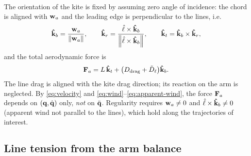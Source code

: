 \documentclass[10pt, a4paper]{article}
\begin{document}
The orientation of the kite is fixed by
assuming zero angle of incidence: the chord is aligned with $\vb w_a$ and
the leading edge is perpendicular to the lines, i.e.
\begin{equation} \label{eq:aero-frame}
    \vu k_b = \frac{\vb w_a}{\norm{\vb w_a}},
    \qquad
    \vu k_r = \frac{\hat \ell \times \vu k_b}{\norm{\hat \ell \times \vu k_b}},
    \qquad
    \vu k_t = \vu k_b \times \vu k_r,
\end{equation}
and the total aerodynamic force is
\begin{equation} \label{eq:f-aero}
    \vb F_a = L\,\vu k_t
    + \bigl( D_{\mathrm{drag}} + \tilde D_\ell \bigr) \vu k_b.
\end{equation}
The line drag is aligned with the kite drag direction; its reaction on
the arm is neglected.
By \eqref{eq:velocity} and \eqref{eq:wind}--\eqref{eq:apparent-wind}, the
force $\vb F_a$ depends on
$(\vb q, \dot{\vb q})$ only, \emph{not} on $\ddot{\vb q}$.  Regularity requires
$\vb w_a \ne 0$ and $\hat \ell \times \vu k_b \ne 0$ (apparent wind not parallel
to the lines), which hold along the trajectories of interest.

\subsection{Line tension from the arm balance}
\end{document}
